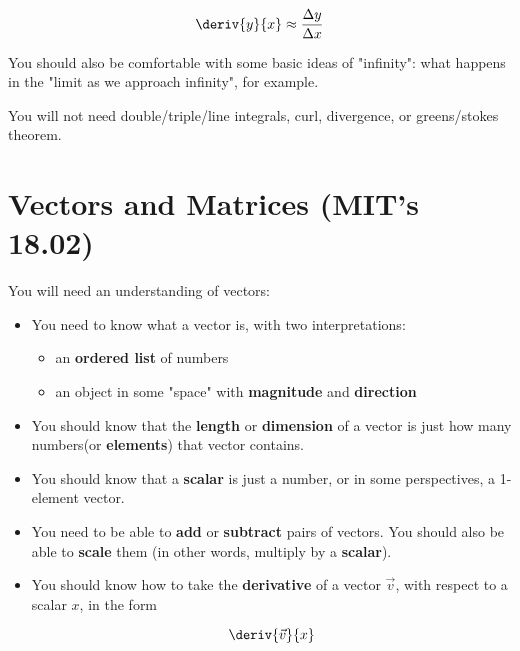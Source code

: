     \begin{equation}
        \deriv{y}{x} \approx \frac{ \Delta y}{ \Delta x}
    \end{equation}
    
    You should also be comfortable with some basic ideas of "infinity": what happens in the "limit as we approach infinity", for example.
    
    
    You will not need double/triple/line integrals, curl, divergence, or greens/stokes theorem.
    
\section{Vectors and Matrices (MIT's 18.02)}

    You will need an understanding of vectors:
    \begin{itemize}
        \item You need to know what a vector is, with two interpretations:
            \begin{itemize}
                \item an \textbf{ordered list} of numbers
                \item an object in some "space" with \textbf{magnitude} and \textbf{direction}
            \end{itemize}
        
        \item You should know that the \textbf{length} or \textbf{dimension} of a vector is just how many numbers(or \textbf{elements}) that vector contains.
        
        \item You should know that a \textbf{scalar} is just a number, or in some perspectives, a 1-element vector.
        
        \item You need to be able to \textbf{add} or \textbf{subtract} pairs of vectors. You should also be able to \textbf{scale} them (in other words, multiply by a \textbf{scalar}).
        
        \item You should know how to take the \textbf{derivative} of a vector $\vec{v}$, with respect to a scalar $x$, in the form
        
        \begin{equation}
            \deriv{\vec{v}}{x}
        \end{equation}
    \end{itemize}
    
